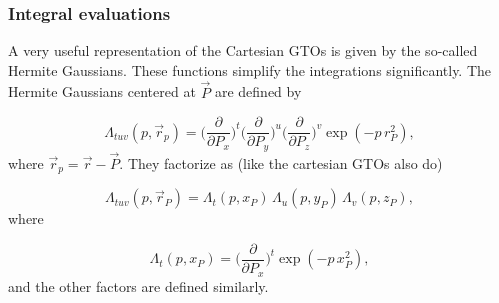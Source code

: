 \documentclass{beamer}
\begin{document}
\begin{frame}
\frametitle{Integral evaluations}

\begin{block}{}

A very useful representation of the Cartesian GTOs is given by the so-called Hermite Gaussians. These functions simplify 
the integrations significantly. The Hermite Gaussians centered at $\vec P$ are defined by

\begin{equation}
 \Lambda_{tuv}(p, \vec r_p) = \Big(\frac{\partial}{\partial P_x}\Big)^t \Big(\frac{\partial}{\partial P_y}\Big)^u \Big(\frac{\partial}{\partial P_z}\Big)^v \exp(-p\, r^2_P),
\end{equation}
where $\vec r_p = \vec r - \vec P$. They factorize as (like the cartesian GTOs also do)

\begin{equation}
 \Lambda_{tuv}(p, \vec r_P) = \Lambda_t(p,x_P)\,\Lambda_u(p,y_P)\,\Lambda_v(p,z_P),
\end{equation}
where

\begin{equation}
\label{eq:HermiteGaussian_x}
 \Lambda_t(p,x_P) = \Big(\frac{\partial}{\partial P_x}\Big)^t \exp(-p\,x^2_P),
\end{equation}
and the other factors are defined similarly. 
\end{block}
\end{frame}
\end{document}
